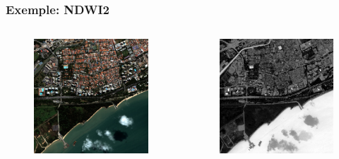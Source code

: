 \documentclass[compress]{beamer}
\begin{document}
\begin{frame}
\frametitle{Exemple: NDWI2}
\begin{columns}
\begin{column}{0.5\textwidth}
\begin{figure}[]
  \includegraphics[width=1.0\textwidth]{radio2-extract-3b.jpg}
\end{figure}
\end{column}
\begin{column}{0.5\textwidth}
\begin{figure}[]
  \includegraphics[width=1.0\textwidth]{Radiometry-NDWI2.jpg}
\end{figure}
\end{column}
\end{columns}
\end{frame}
\end{document}
